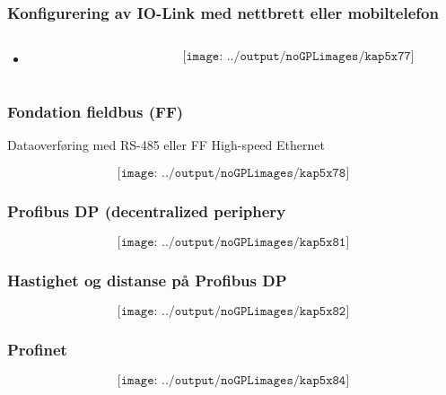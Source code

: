 \documentclass[aspectratio=169,xcolor=dvipsnames]{beamer}
\begin{document}
\begin{frame}
	\frametitle{Konfigurering av IO-Link med nettbrett eller mobiltelefon}
	\begin{columns}
		\begin{column}{0.5\textwidth}

			\begin{itemize}
				\item      
			\end{itemize}

			
		\end{column}

		\begin{column}{0.5\textwidth}
	$$\texttt{[image: ../output/noGPLimages/kap5x77]}$$
		\end{column}
	\end{columns}
\end{frame}
\begin{frame}
	\frametitle{Fondation fieldbus (FF)}

Dataoverføring med RS-485 eller FF High-speed Ethernet

			

	$$\texttt{[image: ../output/noGPLimages/kap5x78]}$$
\end{frame}
\begin{frame}
	\frametitle{Profibus DP (decentralized periphery}
	$$\texttt{[image: ../output/noGPLimages/kap5x81]}$$
\end{frame}
\begin{frame}
	\frametitle{Hastighet og distanse på Profibus DP}
	$$\texttt{[image: ../output/noGPLimages/kap5x82]}$$
\end{frame}
\begin{frame}
	\frametitle{Profinet}
	$$\texttt{[image: ../output/noGPLimages/kap5x84]}$$
\end{frame}
\end{document}
